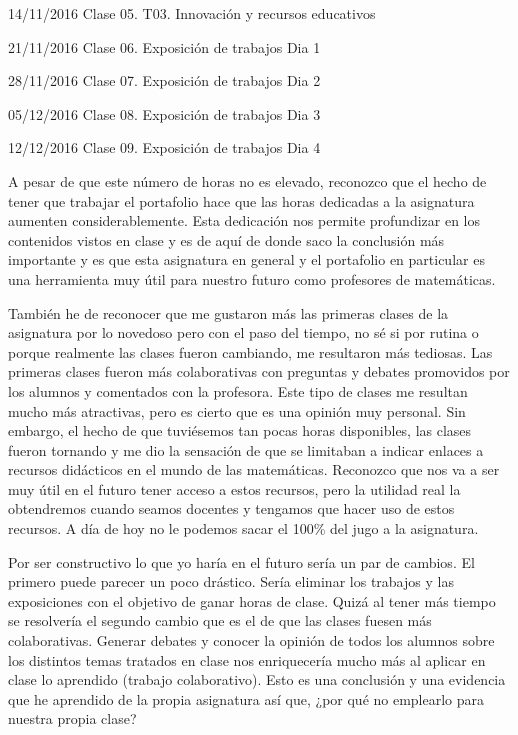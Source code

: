 \begin{leftbar}{\guscolor}
14/11/2016 Clase 05. T03. Innovación y recursos educativos

21/11/2016 Clase 06. Exposición de trabajos Dia 1

28/11/2016 Clase 07. Exposición de trabajos Dia 2

05/12/2016 Clase 08. Exposición de trabajos Dia 3

12/12/2016 Clase 09. Exposición de trabajos Dia 4

A pesar de que este número de horas no es elevado, reconozco que el hecho de tener que trabajar el portafolio hace que las horas dedicadas a la asignatura aumenten considerablemente. Esta dedicación nos permite profundizar en los contenidos vistos en clase y es de aquí de donde saco la conclusión más importante y es que esta asignatura en general y el portafolio en particular es una herramienta muy útil para nuestro futuro como profesores de matemáticas.

También he de reconocer que me gustaron más las primeras clases de la asignatura por lo novedoso pero con el paso del tiempo, no sé si por rutina o porque realmente las clases fueron cambiando, me resultaron más tediosas. Las primeras clases fueron más colaborativas con preguntas y debates promovidos por los alumnos y comentados con la profesora. Este tipo de clases me resultan mucho más atractivas, pero es cierto que es una opinión muy personal. Sin embargo, el hecho de que tuviésemos tan pocas horas disponibles, las clases fueron tornando y me dio la sensación de que se limitaban a indicar enlaces a recursos didácticos en el mundo de las matemáticas. Reconozco que nos va a ser muy útil en el futuro tener acceso a estos recursos, pero la utilidad real la obtendremos cuando seamos docentes y tengamos que hacer uso de estos recursos. A día de hoy no le podemos sacar el 100\% del jugo a la asignatura.

Por ser constructivo lo que yo haría en el futuro sería un par de cambios. El primero puede parecer un poco drástico. Sería eliminar los trabajos y las exposiciones con el objetivo de ganar horas de clase. Quizá al tener más tiempo se resolvería el segundo cambio que es el de que las clases fuesen más colaborativas. Generar debates y conocer la opinión de todos los alumnos sobre los distintos temas tratados en clase nos enriquecería mucho más al aplicar en clase lo aprendido (trabajo colaborativo). Esto es una conclusión y una evidencia que he aprendido de la propia asignatura así que, ¿por qué no emplearlo para nuestra propia clase?


\end{leftbar}
